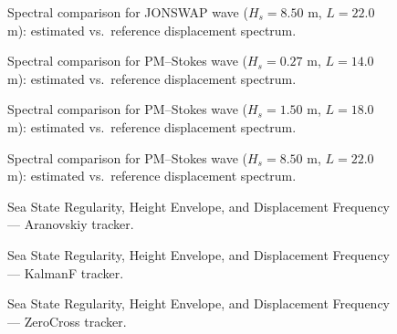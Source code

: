 \documentclass[11pt,letterpaper]{article}
\begin{document}
\begin{figure}[H]\centering
  \resizebox{\textwidth}{!}{}
  \caption{Spectral comparison for JONSWAP wave ($H_s = 8.50$ m, $L = 22.0$ m):
  estimated vs.\ reference displacement spectrum.}
  \label{fig:regspec_jonswap_high}
\end{figure}

\begin{figure}[H]\centering
  \resizebox{\textwidth}{!}{}
  \caption{Spectral comparison for PM–Stokes wave ($H_s = 0.27$ m, $L = 14.0$ m):
  estimated vs.\ reference displacement spectrum.}
  \label{fig:regspec_pmstokes_low}
\end{figure}

\begin{figure}[H]\centering
  \resizebox{\textwidth}{!}{}
  \caption{Spectral comparison for PM–Stokes wave ($H_s = 1.50$ m, $L = 18.0$ m):
  estimated vs.\ reference displacement spectrum.}
  \label{fig:regspec_pmstokes_medium}
\end{figure}

\begin{figure}[H]\centering
  \resizebox{\textwidth}{!}{}
  \caption{Spectral comparison for PM–Stokes wave ($H_s = 8.50$ m, $L = 22.0$ m):
  estimated vs.\ reference displacement spectrum.}
  \label{fig:regspec_pmstokes_high}
\end{figure}


\begin{figure}[H]\centering
  \resizebox{\textwidth}{!}{}
  \caption{Sea State Regularity, Height Envelope, and Displacement Frequency — Aranovskiy tracker.}
  \label{fig:seareg_aranovskiy}
\end{figure}

\begin{figure}[H]\centering
  \resizebox{\textwidth}{!}{}
  \caption{Sea State Regularity, Height Envelope, and Displacement Frequency — KalmanF tracker.}
  \label{fig:seareg_kalmanf}
\end{figure}

\begin{figure}[H]\centering
  \resizebox{\textwidth}{!}{}
  \caption{Sea State Regularity, Height Envelope, and Displacement Frequency — ZeroCross tracker.}
  \label{fig:seareg_zerocross}
\end{figure}
\end{document}
